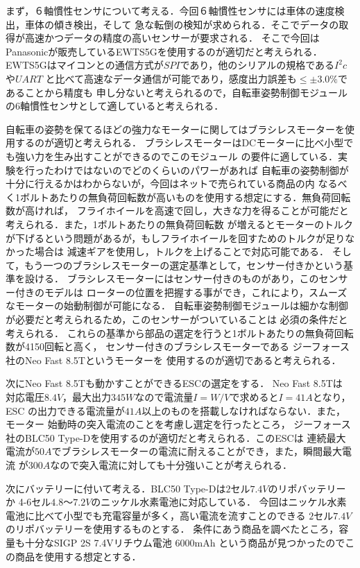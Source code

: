 \documentclass[uplatex,dvipdfmx]{jsarticle}
\begin{document}
まず，６軸慣性センサについて考える．今回６軸慣性センサには車体の速度検出，車体の傾き検出，そして
急な転倒の検知が求められる．そこでデータの取得が高速かつデータの精度の高いセンサーが要求される．
そこで今回はPanasonicが販売しているEWTS5Gを使用するのが適切だと考えられる．
EWTS5Gはマイコンとの通信方式が$SPI$であり，他のシリアルの規格である$I^2c$や$UART$
と比べて高速なデータ通信が可能であり，感度出力誤差も$\leq \pm 3.0\%$であることから精度も
申し分ないと考えられるので，自転車姿勢制御モジュールの6軸慣性センサとして適していると考えられる．


自転車の姿勢を保てるほどの強力なモーターに関してはブラシレスモーターを使用するのが適切と考えられる．
ブラシレスモーターはDCモーターに比べ小型でも強い力を生み出すことができるのでこのモジュール
の要件に適している．実験を行ったわけではないのでどのくらいのパワーがあれば
自転車の姿勢制御が十分に行えるかはわからないが，今回はネットで売られている商品の内
なるべく1ボルトあたりの無負荷回転数が高いものを使用する想定にする．無負荷回転数が高ければ，
フライホイールを高速で回し，大きな力を得ることが可能だと考えられる．また，1ボルトあたりの無負荷回転数
が増えるとモーターのトルクが下げるという問題があるが，もしフライホイールを回すためのトルクが足りなかった場合は
減速ギアを使用し，トルクを上げることで対応可能である．
そして，もう一つのブラシレスモーターの選定基準として，センサー付きかという基準を設ける．
ブラシレスモーターにはセンサー付きのものがあり，このセンサー付きのモデルは
ローターの位置を把握する事ができ，これにより，スムーズなモーターの始動制御が可能になる．
自転車姿勢制御モジュールは細かな制御が必要だと考えられるため，このセンサーがついていることは
必須の条件だと考えられる．
これらの基準から部品の選定を行うと1ボルトあたりの無負荷回転数が4150回転と高く，
センサー付きのブラシレスモーターである
ジーフォース社のNeo Fast 8.5Tというモーターを
使用するのが適切であると考えられる．


次にNeo Fast 8.5Tも動かすことができるESCの選定をする．
Neo Fast 8.5Tは
対応電圧$8.4V$，最大出力$345W$なので電流量$I=W/V$で求めると$I=41A$となり，ESC
の出力できる電流量が$41A$以上のものを搭載しなければならない．また，モーター
始動時の突入電流のことを考慮し選定を行ったところ，
ジーフォース社のBLC50 Type-Dを使用するのが適切だと考えられる．このESCは
連続最大電流が$50A$でブラシレスモーターの電流に耐えることができ，また，瞬間最大電流
が$300A$なので突入電流に対しても十分強いことが考えられる．

次にバッテリーに付いて考える．BLC50 Type-Dは$2$セル$7.4V$のリポバッテリーか
4-6セル$4.8〜7.2V$のニッケル水素電池に対応している．
今回はニッケル水素電池に比べて小型でも充電容量が多く，高い電流を流すことのできる
$2$セル$7.4V$のリポバッテリーを使用するものとする．
条件にあう商品を調べたところ，容量も十分なSIGP 2S 7.4Vリチウム電池 6000mAh
という商品が見つかったのでこの商品を使用する想定とする．
\end{document}
